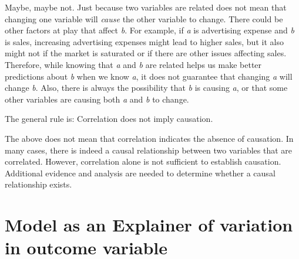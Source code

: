 \documentclass[
  12pt,
  letterpaper,
  DIV=11,
  numbers=noendperiod]{scrreprt}
\begin{document}
\begin{tcolorbox}[enhanced jigsaw, colback=white, leftrule=.75mm, toprule=.15mm, bottomtitle=1mm, breakable, coltitle=black, toptitle=1mm, title={Suggested answer}, opacitybacktitle=0.6, colbacktitle=quarto-callout-note-color!10!white, arc=.35mm, left=2mm, colframe=quarto-callout-note-color-frame, titlerule=0mm, rightrule=.15mm, bottomrule=.15mm, opacityback=0]

Maybe, maybe not. Just because two variables are related does not mean
that changing one variable will \emph{cause} the other variable to
change. There could be other factors at play that affect \emph{b}. For
example, if \emph{a} is advertising expense and \emph{b} is sales,
increasing advertising expenses might lead to higher sales, but it also
might not if the market is saturated or if there are other issues
affecting sales. Therefore, while knowing that \emph{a} and \emph{b} are
related helps us make better predictions about \emph{b} when we know
\emph{a}, it does not guarantee that changing \emph{a} will change
\emph{b}. Also, there is always the possibility that \emph{b} is causing
\emph{a}, or that some other variables are causing both \emph{a} and
\emph{b} to change.

The general rule is: Correlation does not imply causation.

\end{tcolorbox}

\begin{tcolorbox}[enhanced jigsaw, colback=white, leftrule=.75mm, toprule=.15mm, bottomtitle=1mm, breakable, coltitle=black, toptitle=1mm, title=\textcolor{quarto-callout-warning-color}{\faExclamationTriangle}\hspace{0.5em}{Warning}, opacitybacktitle=0.6, colbacktitle=quarto-callout-warning-color!10!white, arc=.35mm, left=2mm, colframe=quarto-callout-warning-color-frame, titlerule=0mm, rightrule=.15mm, bottomrule=.15mm, opacityback=0]

The above does not mean that correlation indicates the absence of
causation. In many cases, there is indeed a causal relationship between
two variables that are correlated. However, correlation alone is not
sufficient to establish causation. Additional evidence and analysis are
needed to determine whether a causal relationship exists.

\end{tcolorbox}

\section{Model as an Explainer of variation in outcome
variable}\label{model-as-an-explainer-of-variation-in-outcome-variable}
\end{document}
